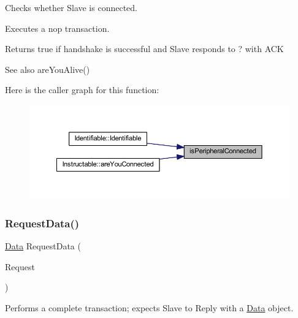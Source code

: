 Checks whether Slave is connected. 

Executes a nop transaction. \begin{DoxyReturn}{Returns}
true if handshake is successful and Slave responds to \textquotesingle{}?\textquotesingle{} with \textquotesingle{}A\+CK\textquotesingle{} 
\end{DoxyReturn}
\begin{DoxySeeAlso}{See also}
are\+You\+Alive() 
\end{DoxySeeAlso}
Here is the caller graph for this function\+:
\nopagebreak
\begin{figure}[H]
\begin{center}
\leavevmode
\includegraphics[width=350pt]{class_communicative_ac3d11fc6a7b276a19b1d92cd19e9a046_icgraph}
\end{center}
\end{figure}
\mbox{\label{class_communicative_a0a56aaa3248edae66ccb13cbf2bf156a}} 
\subsubsection{\texorpdfstring{RequestData()}{RequestData()}}
{\footnotesize\ttfamily \mbox{\hyperlink{struct_data}{Data}} Request\+Data (\begin{DoxyParamCaption}\item[{const \mbox{\hyperlink{structm_cmd}{m\+Cmd}}}]{Request }\end{DoxyParamCaption})}



Performs a complete transaction; expects Slave to Reply with a \mbox{\hyperlink{struct_data}{Data}} object. 

